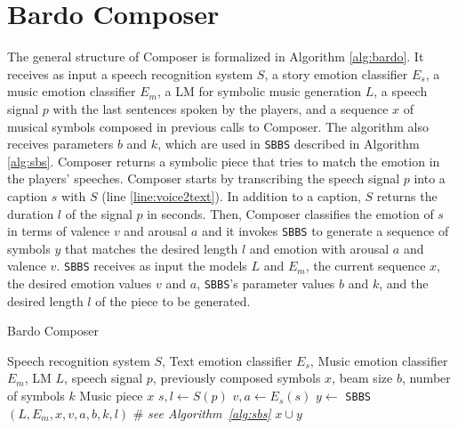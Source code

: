 \section{Bardo Composer}

The general structure of Composer is formalized in Algorithm \ref{alg:bardo}. It receives as input a speech recognition system $S$, a story emotion classifier $E_s$, a music emotion classifier $E_m$, a LM for symbolic music generation $L$, a speech signal $p$ with the last sentences spoken by the players, and a sequence $x$ of musical symbols composed in previous calls to Composer. The algorithm also receives parameters $b$ and $k$, which are used in \texttt{SBBS} described in Algorithm \ref{alg:sbs}. Composer returns a symbolic piece that tries to match the emotion in the players' speeches. Composer starts by transcribing the speech signal $p$ into a caption $s$ with $S$ (line \ref{line:voice2text}). In addition to a caption, $S$ returns the duration $l$ of the signal $p$ in seconds. Then, Composer classifies the emotion of $s$ in terms of valence $v$ and arousal $a$ and it invokes \texttt{SBBS} to generate a sequence of symbols $y$ that matches the desired length $l$ and emotion with arousal $a$ and valence $v$. \texttt{SBBS} receives as input the models $L$ and $E_m$, the current sequence $x$, the desired emotion values $v$ and $a$, \texttt{SBBS}'s parameter values $b$ and $k$, and the desired length $l$ of the piece to be generated. %

\begin{algorithm}[h]
\caption{Bardo Composer}
\label{alg:bardo}
\begin{algorithmic}[1]
\REQUIRE Speech recognition system $S$, Text emotion classifier $E_s$, Music emotion classifier $E_m$, LM $L$, speech signal $p$, previously composed symbols $x$, beam size $b$, number of symbols $k$
\ENSURE Music piece $x$
\STATE $s, l \gets S(p)$ \label{line:voice2text}
\STATE $v, a \gets E_s(s)$ \label{line:emotion_classification}
\STATE $y \gets$ \texttt{SBBS}$(L, E_m, x, v, a, b, k, l)$ \# \emph{see Algorithm~\ref{alg:sbs}} \label{line:sbs}
\RETURN $x \cup y$ \label{line:generation2}
\end{algorithmic}
\end{algorithm}


